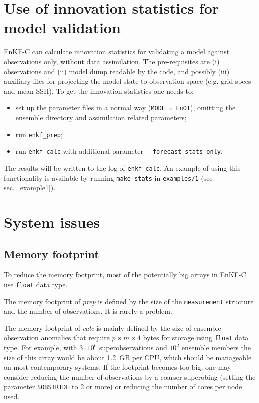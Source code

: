 \documentclass[11pt]{report}
\begin{document}
\section{Use of innovation statistics for model validation}

EnKF-C can calculate innovation statistics for validating a model against observations only, without data assimilation.
The pre-requisites are (i) observations and (ii) model dump readable by the code, and possibly (iii) auxiliary files for projecting the model state to observation space (e.g. grid specs and mean SSH).
To get the innovation statistics one needs to:
\begin{itemize}
\item set up the parameter files in a normal way (\verb|MODE = EnOI|), omitting the ensemble directory and assimilation related parameters;
\item run \verb|enkf_prep|;
\item run \verb|enkf_calc| with additional parameter \verb|--forecast-stats-only|.
\end{itemize}
The results will be written to the log of \verb|enkf_calc|. 
An example of using this functionality is available by running \verb|make stats| in \verb|examples/1| (see sec.~\ref{example1}).

\section{System issues}

\subsection{Memory footprint}

To reduce the memory footprint, most of the potentially big arrays in EnKF-C use \verb|float| data type.

The memory footprint of \emph{prep} is defined by the size of the \verb|measurement| structure and the number of observations.
It is rarely a problem.

The memory footprint of \emph{calc} is mainly defined by the size of ensemble observation anomalies that require $p \times m \times 4$ bytes for storage using \verb|float| data type.
For example, with $3 \cdot 10^6$ superobservations and $10^2$ ensemble members the size of this array would be about 1.2\, GB per CPU, which should be manageable on most contemporary systems.
If the footprint becomes too big, one may consider reducing the number of observations by a coarser superobing (setting the parameter \verb|SOBSTRIDE| to 2 or more) or reducing the number of cores per node used.
\end{document}
